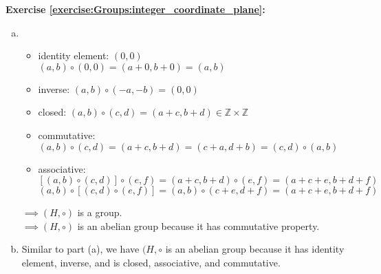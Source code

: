 \noindent\textbf{Exercise \ref{exercise:Groups:integer_coordinate_plane}:}
\begin{enumerate}[(a)]
\item
	\begin{itemize}
	\item
	identity element: $(0, 0)$\\
	$(a, b) \circ (0, 0) = (a + 0, b + 0) = (a, b)$

	\item
	inverse: $(a, b) \circ (-a, -b) = (0, 0)$

	\item
	closed: $(a, b) \circ (c, d) = (a + c, b + d) \in {\mathbb Z} \times {\mathbb Z}$

	\item
	commutative: $(a, b) \circ (c, d) = (a + c, b + d) = (c + a, d + b) = (c, d) \circ (a, b)$

	\item
	associative:\\
	$[(a, b)\circ (c, d)]\circ (e, f) = (a + c, b + d)\circ (e, f) = (a + c + e, b + d + f)$\\
	$(a, b)\circ[(c, d)\circ (e, f)] = (a, b)\circ (c + e, d + f) = (a + c + e, b + d + f)$
	\end{itemize}

$\implies (H,\circ)$ is a group.\\
$\implies (H,\circ)$ is an abelian group because it has commutative property.

\item
Similar to part (a), we have $(H,\circ$ is an abelian group because it has identity element, inverse, and is closed, associative, and commutative.
\end{enumerate}

